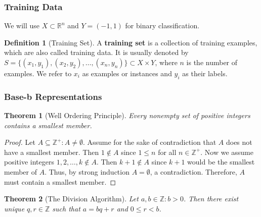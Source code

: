 \documentclass[12pt, titlepage]{amsart}
\newcommand\Z{{\mathbb Z}}
\newcommand\R{{\mathbb R}}
\newtheorem{theorem}{Theorem}[subsection]
\theoremstyle{definition}
\newtheorem{definition}{Definition}[subsection]
\begin{document}
	\subsubsection{Training Data}
	
	We will use $X \subset \R^n$ and $Y = (-1, 1)$ for binary classification. 
	
	\begin{definition}[Training Set]
		A \textbf{training set} is a collection of training examples, which are also called training data. It is usually denoted by $S = \{ (x_1, y_1),(x_2, y_2),\ldots, (x_n, y_n)\} \subset X \times Y$, where $n$ is the number of examples. We refer to $x_i$ as examples or instances and $y_i$ as their labels.\cite{christianini}
	\end{definition}
	
	
	\subsubsection{Base-b Representations}	
	
	\begin{theorem}[Well Ordering Principle]\label{theorem:well_ordering_principle}
		Every nonempty set of positive integers contains a smallest member. \cite{mathworld:well_ordering_principle}
	\end{theorem}
	
	\begin{proof}
		Let $A \subseteq \Z^+ : A \neq \emptyset$. Assume for the sake of contradiction that $A$ does not have a smallest member. Then $1 \not\in A$ since $1 \leq n$ for all $n \in \Z^+$. Now we assume positive integers $1, 2, \ldots, k \not\in A$. Then $k + 1 \not\in A$ since $k + 1$ would be the smallest member of $A$. Thus, by strong induction $A = \emptyset$, a contradiction. Therefore, $A$ must contain a smallest member.
	\end{proof}
	
	\begin{theorem}[The Division Algorithm]\label{theorem:division_algorithm}
		Let $a, b \in \Z : b > 0$. Then there exist unique $q, r \in \Z$ such that $ a = bq + r $ and $0 \leq r < b$. \cite{pommersheim}
	\end{theorem}	
	
\end{document}
